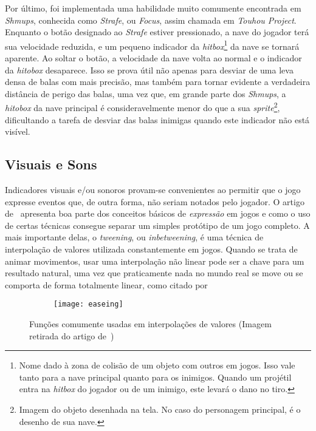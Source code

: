 Por último, foi implementada uma habilidade muito comumente encontrada em \textit{Shmups}, conhecida como \textit{Strafe}, ou \textit{Focus}, assim chamada em \textit{Touhou Project}. Enquanto o botão designado ao \textit{Strafe} estiver pressionado, a nave do jogador terá sua velocidade reduzida, e um pequeno indicador da \textit{hitbox}\footnote{
    Nome dado à zona de colisão de um objeto com outros em jogos. Isso vale tanto para a nave principal quanto para os inimigos. Quando um projétil entra na \textit{hitbox} do jogador ou de um inimigo, este levará o dano no tiro.
} da nave se tornará aparente. Ao soltar o botão, a velocidade da nave volta ao normal e o indicador da \textit{hitobox} desaparece. Isso se prova útil não apenas para desviar de uma leva densa de balas com mais precisão, mas também para tornar evidente a verdadeira distância de perigo das balas, uma vez que, em grande parte dos \textit{Shmups}, a \textit{hitobox} da nave principal é consideravelmente menor do que a sua \textit{sprite}\footnote{
    Imagem do objeto desenhada na tela. No caso do personagem principal, é o desenho de sua nave.
}, dificultando a tarefa de desviar das balas inimigas quando este indicador não está visível.

\subsection{Visuais e Sons}

Indicadores visuais e/ou sonoros provam-se convenientes ao permitir que o jogo expresse eventos que, de outra forma, não seriam notados pelo jogador. O artigo de~\citet{VideoGameJuice} apresenta boa parte dos conceitos básicos de \textit{expressão} em jogos e como o uso de certas técnicas consegue separar um simples protótipo de um jogo completo. A mais importante delas, o \textit{tweening}, ou \textit{inbetweening}, é uma técnica de interpolação de valores utilizada constantemente em jogos. Quando se trata de animar movimentos, usar uma interpolação não linear pode ser a chave para um resultado natural, uma vez que praticamente nada no mundo real se move ou se comporta de forma totalmente linear, como citado por~\citet{VideoGameJuice}

\begin{figure}
    \centering

    \begin{subfigure}{.9\textwidth}
        \centering
        \texttt{[image: easeing]}
    \end{subfigure}

    \caption{Funções comumente usadas em interpolações de valores\label{fig:subfigures} (Imagem retirada do artigo de~\cite{VideoGameJuice})}
\end{figure}

